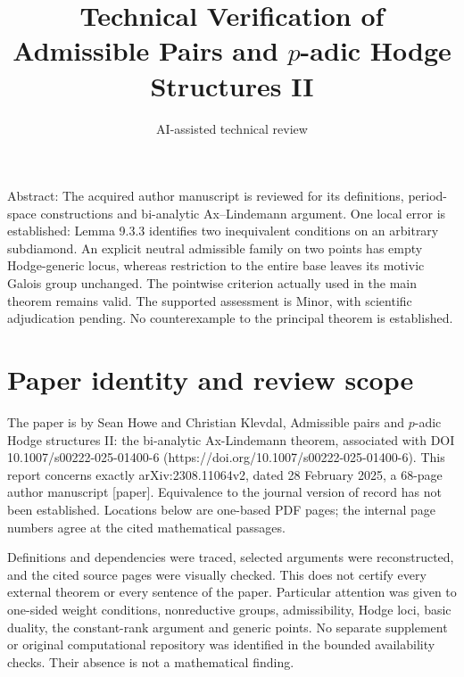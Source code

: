 \documentclass[10pt]{article}
\title{Technical Verification of
Admissible Pairs and \(p\)-adic Hodge Structures II}
\author{AI-assisted technical review}
\date{}
\begin{document}
\maketitle
Abstract: The acquired author manuscript is reviewed for its definitions, period-space constructions and bi-analytic Ax–Lindemann argument. One local error is established: Lemma 9.3.3 identifies two inequivalent conditions on an arbitrary subdiamond. An explicit neutral admissible family on two points has empty Hodge-generic locus, whereas restriction to the entire base leaves its motivic Galois group unchanged. The pointwise criterion actually used in the main theorem remains valid. The supported assessment is Minor, with scientific adjudication pending. No counterexample to the principal theorem is established.\par
\section*{Paper identity and review scope}
The paper is by Sean Howe and Christian Klevdal, Admissible pairs and \(p\)-adic Hodge structures II: the bi-analytic Ax-Lindemann theorem, associated with DOI 10.1007/s00222-025-01400-6 (https://doi.org/10.1007/s00222-025-01400-6). This report concerns exactly arXiv:2308.11064v2, dated 28 February 2025, a 68-page author manuscript [paper]. Equivalence to the journal version of record has not been established. Locations below are one-based PDF pages; the internal page numbers agree at the cited mathematical passages.\par
Definitions and dependencies were traced, selected arguments were reconstructed, and the cited source pages were visually checked. This does not certify every external theorem or every sentence of the paper. Particular attention was given to one-sided weight conditions, nonreductive groups, admissibility, Hodge loci, basic duality, the constant-rank argument and generic points. No separate supplement or original computational repository was identified in the bounded availability checks. Their absence is not a mathematical finding.\par
\end{document}
